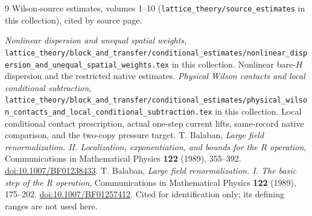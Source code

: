 \documentclass[11pt,letterpaper]{article}
\theoremstyle{plain}
\theoremstyle{remark}\newtheorem{remark}[theorem]{Scope}
\begin{document}
\begingroup\small\raggedright
\begin{thebibliography}{9}
\setlength{\itemsep}{3pt}
 Wilson-source estimates, volumes 1--10 (\texttt{lattice\_theory/source\_estimates} in this collection), cited by source page.

 \emph{Nonlinear dispersion and unequal spatial weights}, \texttt{lattice\_theory/block\_and\_transfer/conditional\_estimates/nonlinear\_dispersion\_and\_unequal\_spatial\_weights.tex} in this collection. Nonlinear bare-$H$ dispersion and
the restricted native estimates.
 \emph{Physical Wilson contacts and local conditional subtraction}, \texttt{lattice\_theory/block\_and\_transfer/conditional\_estimates/physical\_wilson\_contacts\_and\_local\_conditional\_subtraction.tex} in this collection.
Local conditional contact prescription, actual one-step current lifts,
same-record native comparison, and the two-copy pressure target.
 T. Balaban, \emph{Large field renormalization. II.
Localization, exponentiation, and bounds for the R operation},
Communications in Mathematical Physics \textbf{122} (1989), 355--392.
\href{https://doi.org/10.1007/BF01238433}{doi:10.1007/BF01238433}.
 T. Balaban, \emph{Large field renormalization. I.
The basic step of the R operation}, Communications in Mathematical Physics
\textbf{122} (1989), 175--202.
\href{https://doi.org/10.1007/BF01257412}{doi:10.1007/BF01257412}.
Cited for identification only; its defining ranges are not used here.
\end{thebibliography}
\endgroup
\end{document}
